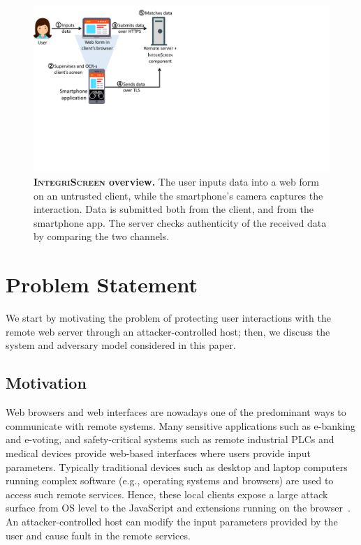 \documentclass[sigconf, anonymous, balance=false]{acmart}
\let\oldding\ding%
\renewcommand{\ding}[2][1]{\scalebox{#1}{\oldding{#2}}}%
\newcommand{\one}{\ding[1.2]{172}\xspace}
\newcommand{\two}{\ding[1.2]{173}\xspace}
\newcommand{\three}{\ding[1.2]{174}\xspace}
\newcommand{\four}{\ding[1.2]{175}\xspace}
\newcommand{\five}{\ding[1.2]{176}\xspace}
\newcommand{\app}{smartphone app\xspace}
\newcommand{\sysname}{\textsc{IntegriScreen}\xspace}
\begin{document}
\begin{figure}[t]
	\centering
	\includegraphics[trim={0 7cm 17cm 0},clip,width=0.9\linewidth]{img/systemModel.pdf}
	\caption{\textbf{\sysname overview.}
	    \one The user inputs data into a web form on an untrusted client, \two while the smartphone's camera captures the interaction.
	    \three Data is submitted both from the client, and \four from the \app.
		\five The server checks authenticity of the received data by comparing the two channels.}
	\label{fig:systemModel}
\end{figure}



\section{Problem Statement}
\label{sec:problemStatement}


We start by motivating the problem of protecting user interactions with the remote web server through an attacker-controlled host; then, we discuss the system and adversary model considered in this paper.

\vspace{0.15cm}
\subsection{Motivation}

Web browsers and web interfaces are nowadays one of the predominant ways to communicate with remote systems.
Many sensitive applications such as e-banking and e-voting, and safety-critical systems such as remote industrial PLCs and medical devices provide web-based interfaces where users provide input parameters.
Typically traditional devices such as desktop and laptop computers running complex software (e.g., operating systems and browsers) are used to access such remote services. Hence, these local clients expose a large attack surface from OS level to the JavaScript and extensions running on the browser~\cite{driveByDownload, extensionSecurity, extensionSecurity1, extensionHack1, microsoftPatches, kernelSecurity, linuxMalware, zeusMalware, wannacry}. An attacker-controlled host can modify the input parameters provided by the user and cause fault in the remote services.
\end{document}
